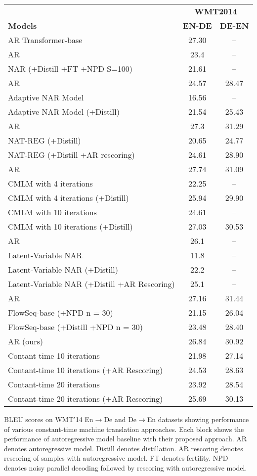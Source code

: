 \centering \small
\begin{tabular}{lcc}
\toprule
 & \multicolumn{2}{c}{\textbf{WMT2014}} \\
\textbf{ Models} & \textbf{EN-DE} & \textbf{DE-EN} \\
\midrule\midrule
AR Transformer-base \citep{vaswani2017attention} & 27.30 & -- \\
\midrule\midrule
AR \citep{gu2018nonauto} & 23.4 & -- \\
NAR (+Distill +FT +NPD S=100) & 21.61 & -- \\
\midrule\midrule
AR \citep{lee2018deterministic} & 24.57 & 28.47 \\
Adaptive NAR Model & 16.56 & -- \\ 
Adaptive NAR Model (+Distill) & 21.54 & 25.43 \\
\midrule\midrule
AR \citep{wang2019nonautoaux} & 27.3 & 31.29 \\
NAT-REG (+Distill) & 20.65 & 24.77 \\ 
NAT-REG (+Distill +AR rescoring) & 24.61 & 28.90 \\
\midrule\midrule
AR \citep{ghazvininejad2019constant} & 27.74 & 31.09 \\
CMLM with 4 iterations & 22.25 & -- \\
CMLM with 4 iterations (+Distill) & 25.94 & 29.90 \\
CMLM with 10 iterations & 24.61 & -- \\
CMLM with 10 iterations (+Distill) & 27.03 & 30.53 \\
\midrule\midrule
AR \citep{shu2019lvnar} & 26.1 & -- \\
Latent-Variable NAR & 11.8 & -- \\
Latent-Variable NAR (+Distill) & 22.2 & -- \\
Latent-Variable NAR (+Distill +AR Rescoring) & 25.1 & -- \\
\midrule\midrule
AR \citep{ma2019flowseq} & 27.16 & 31.44 \\
FlowSeq-base (+NPD n = 30) & 21.15 & 26.04 \\
FlowSeq-base (+Distill +NPD n = 30) & 23.48 & 28.40 \\
\midrule\midrule
AR (ours) & 26.84 & 30.92 \\
Contant-time 10 iterations & 21.98 & 27.14 \\
Contant-time 10 iterations (+AR Rescoring) & 24.53 & 28.63 \\
Contant-time 20 iterations & 23.92 & 28.54 \\
Contant-time 20 iterations (+AR Rescoring) & 25.69 & 30.13 \\
\bottomrule
\end{tabular}
\caption{BLEU scores on WMT'14 En$\rightarrow$De and De$\rightarrow$En datasets showing performance of various constant-time machine translation approaches. Each block shows the performance of autoregressive model baseline with their proposed approach. AR denotes autoregressive model. Distill denotes distillation. AR rescoring denotes rescoring of samples with autoregressive model. FT denotes fertility. NPD denotes noisy parallel decoding followed by rescoring with autoregressive model. }
\label{tab:contant_time_comparison}